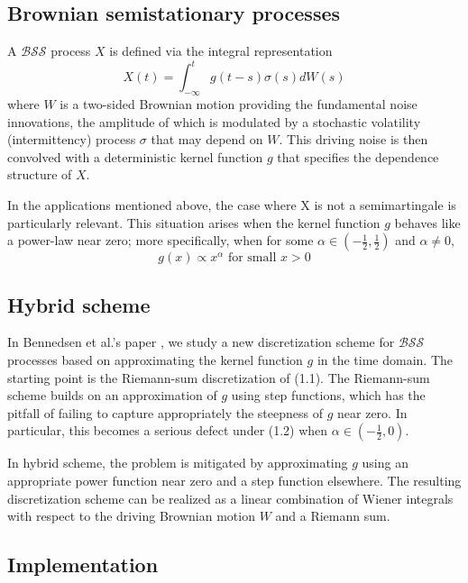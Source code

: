 \documentclass[12pt]{article}
\numberwithin{equation}{section}
\begin{document}
	\subsection{Brownian semistationary processes}

		A $\mathcal{BSS}$ process $X$ is defined via the integral representation
		\begin{equation}
        	X(t) = \int_{-\infty}^{t} g(t-s)\sigma(s)dW(s)
        \end{equation}
        where $W$ is a two-sided Brownian motion providing the fundamental noise innovations, the amplitude of which is modulated by a stochastic volatility (intermittency) process $\sigma$ that may depend on $W$. This driving noise is then convolved with a deterministic kernel function $g$ that specifies the dependence structure of $X$.
        
        In the applications mentioned above, the case where X is not a semimartingale is particularly
relevant. This situation arises when the kernel function $g$ behaves like a power-law near zero; more
specifically, when for some $\alpha \in (-\frac{1}{2}, \frac{1}{2})$ and $\alpha \neq 0$,
		\begin{equation}
        	g(x) \propto x^\alpha \text{ for small } x>0
        \end{equation}

    \subsection{Hybrid scheme}
    
    	In Bennedsen et al.'s paper \cite{bennedsen2015hybrid}, we study a new discretization scheme for $\mathcal{BSS}$ processes based on approximating the kernel function $g$ in the time domain. The starting point is the Riemann-sum discretization of (1.1). The Riemann-sum scheme builds on an approximation of $g$ using step functions, which has the pitfall of failing to capture appropriately the steepness of $g$ near zero. In particular, this becomes a serious defect under (1.2) when $\alpha \in (-\frac{1}{2}, 0)$. 
    
    	In hybrid scheme, the problem is mitigated by approximating $g$ using an appropriate power function near zero and a step function elsewhere. The resulting discretization scheme can be realized as a linear combination of Wiener integrals with respect to the driving Brownian motion $W$ and a Riemann sum.
    
    \subsection{Implementation}
    
\end{document}
